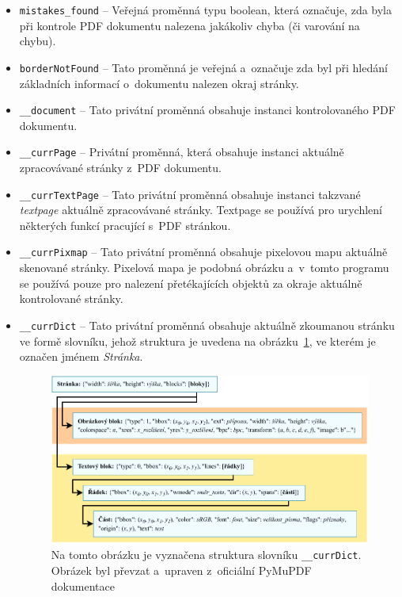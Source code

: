 \begin{itemize}
    \item \texttt{mistakes\_found} -- Veřejná proměnná typu boolean, která označuje,
    zda byla při kontrole PDF dokumentu nalezena jakákoliv chyba (či varování
    na chybu).

    \item \texttt{borderNotFound} -- Tato proměnná je veřejná a~označuje zda byl
    při hledání základních informací o~dokumentu nalezen okraj stránky. 

    \item \texttt{\_\_document} -- Tato privátní proměnná obsahuje instanci
    kontrolovaného PDF dokumentu.

    \item \texttt{\_\_currPage} -- Privátní proměnná, která obsahuje instanci
    aktuálně zpracovávané stránky z~PDF dokumentu.
    
    \item \texttt{\_\_currTextPage} -- Tato privátní proměnná obsahuje instanci
    takzvané \emph{textpage} aktuálně zpracovávané stránky. Textpage se používá
    pro urychlení některých funkcí pracující s~PDF stránkou.
    
    \item \texttt{\_\_currPixmap} -- Tato privátní proměnná obsahuje pixelovou
    mapu aktuálně skenované stránky. Pixelová mapa je podobná obrázku a~v~tomto
    programu se používá pouze pro nalezení přetékajících objektů za okraje
    aktuálně kontrolované stránky.
    
    \item \texttt{\_\_currDict} -- Tato privátní proměnná obsahuje aktuálně
    zkoumanou stránku ve formě slovníku, jehož struktura je uvedena na
    obrázku~\ref{pic_curr_page_dict}, ve kterém je označen jménem \emph{Stránka}.
    \begin{figure}[H]
        \centering
        \includegraphics[width=\linewidth]{obrazky-figures/page_dictionary.pdf}
        \caption{
            Na tomto obrázku je vyznačena struktura slovníku \texttt{\_\_currDict}.
            Obrázek byl převzat a~upraven z~oficiální PyMuPDF 
            dokumentace~\cite[Cesta: \emph{TextPage}]{PyMuPDF} 
            }
        \label{pic_curr_page_dict}
    \end{figure}
    

\end{itemize}
